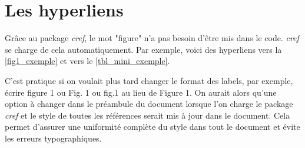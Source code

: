 \documentclass[exemple_master.tex]{subfiles}
\begin{document}
\section{Les hyperliens}

Grâce au package \emph{cref}, le mot "figure" n'a pas besoin d'être mis dans le code. \emph{cref} se charge de cela automatiquement. Par exemple, voici des hyperliens vers la \cref{fig1_exemple} et vers le \cref{tbl_mini_exemple}.

C'est pratique si on voulait plus tard changer le format des labels, par exemple, écrire figure 1 ou Fig. 1 ou fig.1 au lieu de Figure 1. On aurait alors qu'une option à changer dans le préambule du document lorsque l'on charge le package \emph{cref} et le style de toutes les références serait mis à jour dans le document. Cela permet d'assurer une uniformité complète du style dans tout le document et évite les erreurs typographiques.
\end{document}
